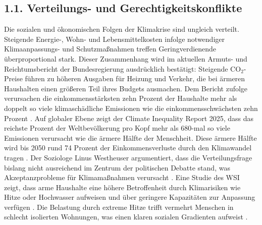 \documentclass[12pt, a4paper]{article}
\begin{document}
	\subsection*{1.1. Verteilungs- und Gerechtigkeitskonflikte}
	Die sozialen und ökonomischen Folgen der Klimakrise sind ungleich verteilt.
	Steigende Energie-, Wohn- und Lebensmittelkosten infolge notwendiger
	Klimaanpassungs- und Schutzmaßnahmen treffen Geringverdienende überproportional stark.
	Dieser Zusammenhang wird im aktuellen Armuts- und Reichtumsbericht der Bundesregierung
	ausdrücklich bestätigt: Steigende CO$_2$-Preise führen zu höheren Ausgaben für Heizung
	und Verkehr, die bei ärmeren Haushalten einen größeren Teil ihres Budgets ausmachen.
	Dem Bericht zufolge verursachen die einkommensstärksten zehn Prozent der Haushalte
	mehr als doppelt so viele klimaschädliche Emissionen wie die einkommensschwächsten
	zehn Prozent \cite{armutsbericht2025}.
	Auf globaler Ebene zeigt der Climate Inequality
	Report 2025, dass das reichste Prozent der Weltbevölkerung pro Kopf mehr als
	680-mal so viele Emissionen verursacht wie die ärmere Hälfte der Menschheit.
	Diese
	ärmere Hälfte wird bis 2050 rund 74 Prozent der Einkommensverluste durch den
	Klimawandel tragen \cite{climateinequality2025}.
	Der Soziologe Linus Westheuser
	argumentiert, dass die Verteilungsfrage bislang nicht ausreichend im Zentrum der
	politischen Debatte stand, was Akzeptanzprobleme für Klimamaßnahmen verursacht
	\cite{westheuser2025}.
	Eine Studie des WSI zeigt, dass arme Haushalte eine höhere
	Betroffenheit durch Klimarisiken wie Hitze oder Hochwasser aufweisen und über
	geringere Kapazitäten zur Anpassung verfügen \cite{rehm2025}.
	Die Belastung durch
	extreme Hitze trifft vermehrt Menschen in schlecht isolierten Wohnungen, was einen
	klaren sozialen Gradienten aufweist \cite{umweltbundesamt2026}.
	
\end{document}
